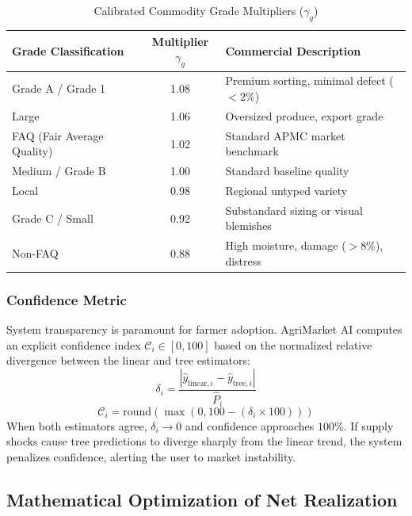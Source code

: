\documentclass[conference]{IEEEtran}
\begin{document}
\begin{table}[htbp]
\caption{Calibrated Commodity Grade Multipliers ($\gamma_g$)}
\begin{center}
\begin{tabular}{lcl}
\toprule
\textbf{Grade Classification} & \textbf{Multiplier $\gamma_g$} & \textbf{Commercial Description} \\
\midrule
Grade A / Grade 1     & 1.08 & Premium sorting, minimal defect ($<2\%$) \\
Large                 & 1.06 & Oversized produce, export grade \\
FAQ (Fair Average Quality) & 1.02 & Standard APMC market benchmark \\
Medium / Grade B      & 1.00 & Standard baseline quality \\
Local                 & 0.98 & Regional untyped variety \\
Grade C / Small       & 0.92 & Substandard sizing or visual blemishes \\
Non-FAQ               & 0.88 & High moisture, damage ($>8\%$), distress \\
\bottomrule
\end{tabular}
\label{tab:grade_multipliers}
\end{center}
\end{table}

\subsubsection{Confidence Metric}
System transparency is paramount for farmer adoption. AgriMarket AI computes an explicit confidence index $\mathcal{C}_i \in [0, 100]$ based on the normalized relative divergence between the linear and tree estimators:
\begin{equation}
\delta_i = \frac{|\hat{y}_{\text{linear}, i} - \hat{y}_{\text{tree}, i}|}{\hat{P}_i}
\end{equation}
\begin{equation}
\mathcal{C}_i = \text{round}\left( \max\left( 0, 100 - (\delta_i \times 100) \right) \right)
\end{equation}
When both estimators agree, $\delta_i \to 0$ and confidence approaches $100\%$. If supply shocks cause tree predictions to diverge sharply from the linear trend, the system penalizes confidence, alerting the user to market instability.

\subsection{Mathematical Optimization of Net Realization}
\end{document}

